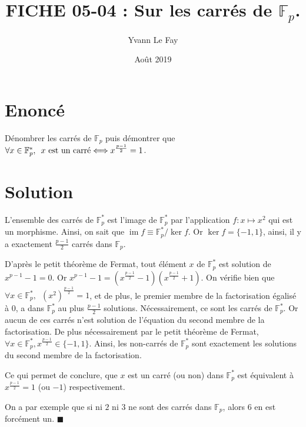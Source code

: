 \documentclass{article}
\newcommand*{\QED}{\hfill\ensuremath{\blacksquare}}%
\DeclareMathOperator{\im}{im}
\begin{document}
\title{FICHE 05-04 : Sur les carrés de $\mathbb{F}_p$.}
\author{Yvann Le Fay}
\date{Août 2019}
\maketitle
\section*{Enoncé}
Dénombrer les carrés de $\mathbb{F}_p$ puis démontrer que $\forall x \in \mathbb{F}_p^*,\,\,\, x  \textup{ est un carré} \Longleftrightarrow x^{\frac{p-1}{2}} = 1$.
\section*{Solution}
L'ensemble des carrés de $\mathbb{F}_p^*$ est l'image de $\mathbb{F}_p^*$ par l'application $f : x \mapsto x^2$ qui est un morphisme. Ainsi, on sait que $\im f \equiv \mathbb{F}_p^*/\ker f$. Or $\ker f = \{-1, 1\}$, ainsi, il y a exactement $\frac{p-1}{2}$ carrés dans $\mathbb{F}_p$.

D'après le petit théorème de Fermat, tout élément $x$ de $\mathbb{F}_p^*$ est solution de $x^{p-1} - 1 = 0$. Or $x^{p-1}  - 1 = (x^{\frac{p-1}{2}}-1)(x^{\frac{p-1}{2}}+1)$. On vérifie bien que $\forall x \in \mathbb{F}_p^*,\,\,\, (x^2)^{\frac{p-1}{2}} = 1$, et de plus, le premier membre de la factorisation égalisé à $0$, a dans $\mathbb{F}_p^*$ au plus $\frac{p-1}{2}$ solutions. Nécessairement, ce sont les carrés de $\mathbb{F}_p^*$. Or aucun de ces carrés n'est solution de l'équation du second membre de la factorisation. De plus nécessairement par le petit théorème de Fermat, $\forall x \in \mathbb{F}_p^*, x^{\frac{p-1}{2}} \in \{-1, 1\}$. Ainsi, les non-carrés de $\mathbb{F}_p^*$ sont exactement les solutions du second membre de la factorisation. 

Ce qui permet de conclure, que $x$ est un carré (ou non) dans $\mathbb{F}_p^*$ est équivalent à $x^{\frac{p-1}{2}} = 1$ (ou $-1$) respectivement.

On a par exemple que si ni $2$ ni $3$ ne sont des carrés dans $\mathbb{F}_p$, alors $6$ en est forcément un.
\QED
\end{document}
